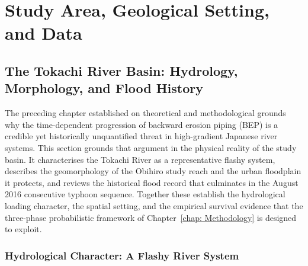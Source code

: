 \chapter{Study Area, Geological Setting, and Data} \label{chap: Study Area, Geological Setting, and Data}

\section{The Tokachi River Basin: Hydrology, Morphology, and Flood History}
\label{sec: The Tokachi River Basin: Hydrology, Morphology, and Flood History}

The preceding chapter established on theoretical and methodological grounds why the time-dependent progression of backward erosion piping (BEP) is a credible yet historically unquantified threat in high-gradient Japanese river systems. This section grounds that argument in the physical reality of the study basin. It characterises the Tokachi River as a representative flashy system, describes the geomorphology of the Obihiro study reach and the urban floodplain it protects, and reviews the historical flood record that culminates in the August 2016 consecutive typhoon sequence. Together these establish the hydrological loading character, the spatial setting, and the empirical survival evidence that the three-phase probabilistic framework of Chapter~\ref{chap: Methodology} is designed to exploit.


\subsection{Hydrological Character: A Flashy River System}
\label{subsec: Hydrological Character: A Flashy River System}

